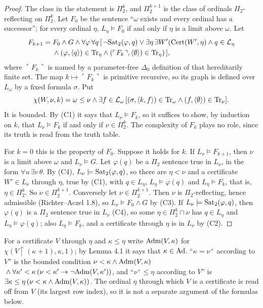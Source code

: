\documentclass[11pt]{article}
\begin{document}
\begin{proof}
The class in the statement is $\Pi_2^k$, and $\Pi_2^{k+1}$ is the class of ordinals $\Pi_2$-reflecting on
$\Pi_2^k$. Let $F_0$ be the sentence ``$\omega$ exists and every ordinal has a successor''; for every ordinal $\eta$, $L_\eta
\models F_0$ if and only if $\eta$ is a limit above $\omega$. Let
\[ \begin{aligned} F_{k+1} = {} & F_0 \wedge G \wedge \forall \varphi\, \forall q\, [\, \neg\mathrm{Sat}_2(\varphi, q) \vee
   \exists \eta\, \exists W' (\mathrm{Cert}(W', \eta) \wedge q \in \mathcal{L}_\eta \\ & \wedge (\varphi, \langle q\rangle) \in
   \mathrm{Tr}_\eta \wedge (\ulcorner F_k\urcorner, \langle \emptyset\rangle) \in \mathrm{Tr}_\eta)\, ], \end{aligned} \]
where $\ulcorner F_k\urcorner$ is named by a parameter-free $\Delta_0$ definition of that hereditarily finite set. The
map $k \mapsto \ulcorner F_k\urcorner$ is primitive recursive, so its graph is defined over $L_\omega$ by a fixed formula
$\sigma$. Put
\[ \chi(W, \nu, k) = \omega \le \nu \wedge \exists f \in \mathcal{L}_\omega\, [(\sigma, \langle k, f\rangle) \in
   \mathrm{Tr}_\omega \wedge (f, \langle \emptyset\rangle) \in \mathrm{Tr}_\nu]. \]
It is bounded. By (C1) it says that $L_\nu \models F_k$, so it suffices to show, by induction on $k$, that $L_\nu
\models F_k$ if and only if $\nu \in \Pi_2^k$. The complexity of $F_k$ plays no role, since its truth is read from the
truth table.

For $k = 0$ this is the property of $F_0$. Suppose it holds for $k$. If $L_\nu \models F_{k+1}$, then $\nu$ is a limit
above $\omega$ and $L_\nu \models G$. Let $\varphi(q)$ be a $\Pi_2$ sentence true in $L_\nu$, in the form $\forall u\,
\exists v\, \theta$. By (C4), $L_\nu \models \mathrm{Sat}_2(\varphi, q)$, so there are $\eta < \nu$ and a certificate $W' \in
L_\nu$ through $\eta$, true by (C1), with $q \in L_\eta$, $L_\eta \models \varphi(q)$ and $L_\eta \models F_k$, that is,
$\eta \in \Pi_2^k$. So $\nu \in \Pi_2^{k+1}$. Conversely let $\nu \in \Pi_2^{k+1}$. Then $\nu$ is $\Pi_2$-reflecting, hence
admissible (Richter--Aczel 1.8), so $L_\nu \models F_0 \wedge G$ by (C3). If $L_\nu \models \mathrm{Sat}_2(\varphi, q)$, then
$\varphi(q)$ is a $\Pi_2$ sentence true in $L_\nu$ (C4), so some $\eta \in \Pi_2^k \cap \nu$ has $q \in L_\eta$ and
$L_\eta \models \varphi(q)$; also $L_\eta \models F_k$, and a certificate through $\eta$ is in $L_\nu$ by (C2).
\end{proof}

For a certificate $V$ through $\eta$ and $\kappa \le \eta$ write $\mathrm{Adm}(V, \kappa)$ for $\chi(V{\restriction}(\kappa+1),
\kappa, 1)$; by Lemma 4.1 it says that $\kappa \in \mathrm{Ad}$. ``$\kappa = \nu^+$ according to $V$'' is the bounded condition
$\nu < \kappa \wedge \mathrm{Adm}(V,\kappa)$ ${}\wedge \forall \kappa' < \kappa\, (\nu < \kappa' \rightarrow \neg\mathrm{Adm}(V,\kappa'))$,
and ``$\nu^+ \le \eta$ according to $V$'' is $\exists \kappa \le \eta\, (\nu < \kappa \wedge \mathrm{Adm}(V,\kappa))$. The
ordinal $\eta$ through which $V$ is a certificate is read off from $V$ (its largest row index), so it is not a separate
argument of the formulas below.
\end{document}
